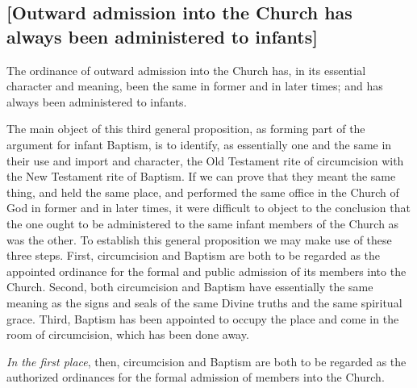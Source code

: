 \documentclass[
]{book}
\begin{document}
\hypertarget{outward-admission-into-the-church-has-always-been-administered-to-infants}{%
\subsection{{[}Outward admission into the Church has always been administered to infants{]}}\label{outward-admission-into-the-church-has-always-been-administered-to-infants}}

The ordinance of outward admission into the Church has, in its essential character and meaning, been the same in former and in later times; and has always been administered to infants.

The main object of this third general proposition, as forming part of the argument for infant Baptism, is to identify, as essentially one and the same in their use and import and character, the Old Testament rite of circumcision with the New Testament rite of Baptism. If we can prove that they meant the same thing, and held the same place, and performed the same office in the Church of God in former and in later times, it were difficult to object to the conclusion that the one ought to be administered to the same infant members of the Church as was the other. To establish this general proposition we may make use of these three steps. First, circumcision and Baptism are both to be regarded as the appointed ordinance for the formal and public admission of its members into the Church. Second, both circumcision and Baptism have essentially the same meaning as the signs and seals of the same Divine truths and the same spiritual grace. Third, Baptism has been appointed to occupy the place and come in the room of circumcision, which has been done away.

\emph{In the first place}, then, circumcision and Baptism are both to be regarded as the authorized ordinances for the formal admission of members into the Church.
\end{document}
